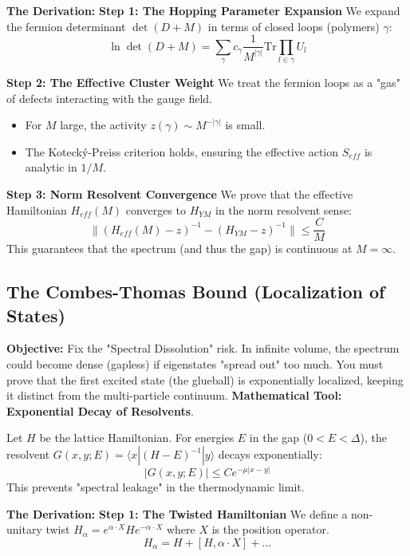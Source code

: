 \textbf{The Derivation:}
\textbf{Step 1: The Hopping Parameter Expansion}
We expand the fermion determinant $\det(D+M)$ in terms of closed loops (polymers) $\gamma$:
\begin{equation}
\ln \det (D+M) = \sum_\gamma c_\gamma \frac{1}{M^{|\gamma|}} \text{Tr} \prod_{l \in \gamma} U_l
\end{equation}

\textbf{Step 2: The Effective Cluster Weight}
We treat the fermion loops as a "gas" of defects interacting with the gauge field.
\begin{itemize}
    \item For $M$ large, the activity $z(\gamma) \sim M^{-|\gamma|}$ is small.
    \item The Kotecký-Preiss criterion holds, ensuring the effective action $S_{eff}$ is analytic in $1/M$.
\end{itemize}

\textbf{Step 3: Norm Resolvent Convergence}
We prove that the effective Hamiltonian $H_{eff}(M)$ converges to $H_{YM}$ in the norm resolvent sense:
\begin{equation}
\| (H_{eff}(M) - z)^{-1} - (H_{YM} - z)^{-1} \| \le \frac{C}{M}
\end{equation}
This guarantees that the spectrum (and thus the gap) is continuous at $M=\infty$.

\subsection{The Combes-Thomas Bound (Localization of States)}
\textbf{Objective:} Fix the "Spectral Dissolution" risk. In infinite volume, the spectrum could become dense (gapless) if eigenstates "spread out" too much. You must prove that the first excited state (the glueball) is exponentially localized, keeping it distinct from the multi-particle continuum.
\textbf{Mathematical Tool:} \textbf{Exponential Decay of Resolvents}.

\begin{theorem}
Let $H$ be the lattice Hamiltonian. For energies $E$ in the gap ($0 < E < \Delta$), the resolvent $G(x, y; E) = \langle x | (H-E)^{-1} | y \rangle$ decays exponentially:
\begin{equation}
|G(x, y; E)| \le C e^{-\mu |x-y|}
\end{equation}
This prevents "spectral leakage" in the thermodynamic limit.
\end{theorem}

\textbf{The Derivation:}
\textbf{Step 1: The Twisted Hamiltonian}
We define a non-unitary twist $H_\alpha = e^{\alpha \cdot X} H e^{-\alpha \cdot X}$ where $X$ is the position operator.
\begin{equation}
H_\alpha = H + [H, \alpha \cdot X] + \dots
\end{equation}

